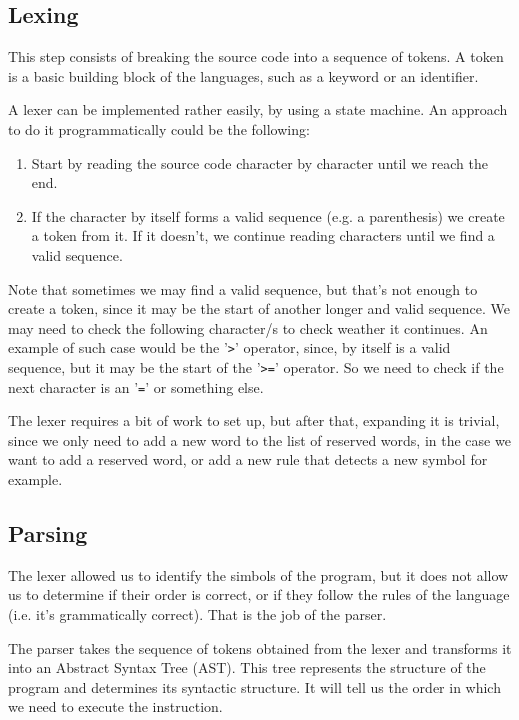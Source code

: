 ﻿\documentclass[10pt,a4paper,twocolumn,twoside]{article}
\begin{document}
\subsection{Lexing} 
This step consists of breaking the source code into a sequence of tokens. A
token is a basic building block of the languages, such as a keyword or an
identifier.

A lexer can be implemented rather easily, by using a state machine. An approach
to do it programmatically could be the following:

\begin{enumerate}
    \item Start by reading the source code character by character until we reach
        the end.
    \item If the character by itself forms a valid sequence (e.g. a parenthesis)
        we create a token from it. If it doesn't, we continue reading characters
        until we find a valid sequence. 
\end{enumerate}

Note that sometimes we may find a valid sequence, but that's not enough to
create a token, since it may be the start of another longer and valid sequence.
We may need to check the following character/s to check weather it continues. An
example of such case would be the '\texttt{>}' operator, since, by itself is a
valid sequence, but it may be the start of the '\texttt{>=}' operator. So we
need to check if the next character is an '\texttt{=}' or something else.

The lexer requires a bit of work to set up, but after that, expanding it is 
trivial, since we only need to add a new word to the list of reserved words, in 
the case we want to add a reserved word, or add a new rule that detects a new 
symbol for example.


\subsection{Parsing}
The lexer allowed us to identify the simbols of the program, but it does not 
allow us to determine if their order is correct, or if they follow the rules of
the language (i.e. it's grammatically correct). That is the job of the parser.

The parser takes the sequence of tokens obtained from the lexer and
transforms it into an Abstract Syntax Tree (AST). This tree represents the
structure of the program and determines its syntactic structure. It will tell us
the order in which we need to execute the instruction.
\end{document}
